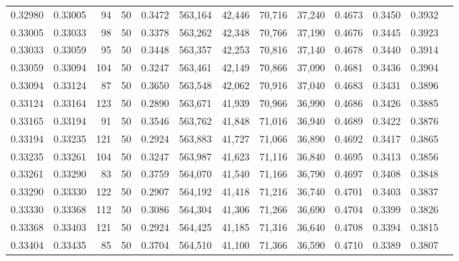 \begin{tabular}{rrrrrrrrrrrrr}
0.32980 & 0.33005 &    94 &  50 &                                     0.3472 & 563,164 &  42,446 &  70,716 &  37,240 & 0.4673 & 0.3450 & 0.3932 \\
0.33005 & 0.33033 &    98 &  50 &                                     0.3378 & 563,262 &  42,348 &  70,766 &  37,190 & 0.4676 & 0.3445 & 0.3923 \\
0.33033 & 0.33059 &    95 &  50 &                                     0.3448 & 563,357 &  42,253 &  70,816 &  37,140 & 0.4678 & 0.3440 & 0.3914 \\
0.33059 & 0.33094 &   104 &  50 &                                     0.3247 & 563,461 &  42,149 &  70,866 &  37,090 & 0.4681 & 0.3436 & 0.3904 \\
0.33094 & 0.33124 &    87 &  50 &                                     0.3650 & 563,548 &  42,062 &  70,916 &  37,040 & 0.4683 & 0.3431 & 0.3896 \\
0.33124 & 0.33164 &   123 &  50 &                                     0.2890 & 563,671 &  41,939 &  70,966 &  36,990 & 0.4686 & 0.3426 & 0.3885 \\
0.33165 & 0.33194 &    91 &  50 &                                     0.3546 & 563,762 &  41,848 &  71,016 &  36,940 & 0.4689 & 0.3422 & 0.3876 \\
0.33194 & 0.33235 &   121 &  50 &                                     0.2924 & 563,883 &  41,727 &  71,066 &  36,890 & 0.4692 & 0.3417 & 0.3865 \\
0.33235 & 0.33261 &   104 &  50 &                                     0.3247 & 563,987 &  41,623 &  71,116 &  36,840 & 0.4695 & 0.3413 & 0.3856 \\
0.33261 & 0.33290 &    83 &  50 &                                     0.3759 & 564,070 &  41,540 &  71,166 &  36,790 & 0.4697 & 0.3408 & 0.3848 \\
0.33290 & 0.33330 &   122 &  50 &                                     0.2907 & 564,192 &  41,418 &  71,216 &  36,740 & 0.4701 & 0.3403 & 0.3837 \\
0.33330 & 0.33368 &   112 &  50 &                                     0.3086 & 564,304 &  41,306 &  71,266 &  36,690 & 0.4704 & 0.3399 & 0.3826 \\
0.33368 & 0.33403 &   121 &  50 &                                     0.2924 & 564,425 &  41,185 &  71,316 &  36,640 & 0.4708 & 0.3394 & 0.3815 \\
0.33404 & 0.33435 &    85 &  50 &                                     0.3704 & 564,510 &  41,100 &  71,366 &  36,590 & 0.4710 & 0.3389 & 0.3807 \\

\end{tabular}
